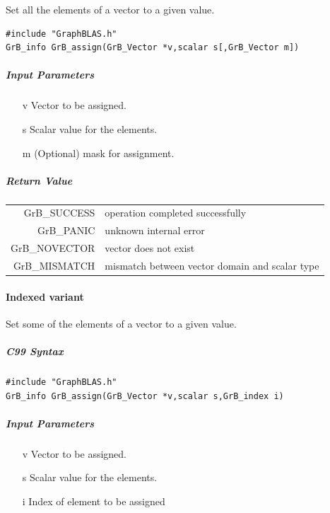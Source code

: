 \documentclass[11pt]{extarticle}
\begin{document}
Set all the elements of a vector to a given value.

\begin{verbatim}
#include "GraphBLAS.h"
GrB_info GrB_assign(GrB_Vector *v,scalar s[,GrB_Vector m])
\end{verbatim}

\subparagraph{Input Parameters}

\begin{itemize}
	\item[{\sf v}] Vector to be assigned.
	\item[{\sf s}] Scalar value for the elements.
	\item[{\sf m}] (Optional) mask for assignment.  
\end{itemize}

\subparagraph{Return Value}

\begin{tabular}{rl}
{\sf GrB\_SUCCESS}	& operation completed successfully \\
{\sf GrB\_PANIC}	& unknown internal error \\
{\sf GrB\_NOVECTOR}	& vector does not exist \\
{\sf GrB\_MISMATCH}	& mismatch between vector domain and scalar type \\
\end{tabular}

\paragraph{Indexed variant}

Set some of the elements of a vector to a given value.

\subparagraph{C99 Syntax}

\begin{verbatim}
#include "GraphBLAS.h"
GrB_info GrB_assign(GrB_Vector *v,scalar s,GrB_index i)
\end{verbatim}

\subparagraph{Input Parameters}

\begin{itemize}
	\item[{\sf v}] Vector to be assigned.
	\item[{\sf s}] Scalar value for the elements.
	\item[{\sf i}] Index of element to be assigned
\end{itemize}
\end{document}
